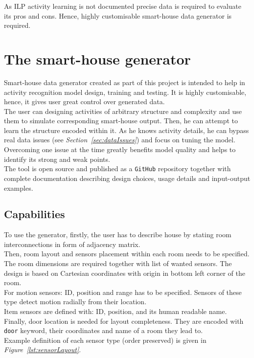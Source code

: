 \documentclass[11pt, a4paper, pdflatex, leqno, twoside, openright]{report}
\begin{document}
As ILP activity learning is not documented precise data is required to evaluate its pros and cons. Hence, highly customisable smart-house data generator is required.

  \section{The smart-house generator}
Smart-house data generator created as part of this project is intended to help in activity recognition model design, training and testing. It is highly customisable, hence, it gives user great control over generated data.\\

The user can designing activities of arbitrary structure and complexity and use them to simulate corresponding smart-house output. Then, he can attempt to learn the structure encoded within it. As he knows activity details, he can bypass real data issues (see \emph{Section~\ref{sec:dataIssues}}) and focus on tuning the model. Overcoming one issue at the time greatly benefits model quality and helps to identify its strong and weak points.\\

The tool is open source and published as a \texttt{GitHub} repository together with complete documentation describing design choices, usage details and input-output examples.

    \subsection{Capabilities}
To use the generator, firstly, the user has to describe house by stating room interconnections in form of adjacency matrix.\\

Then, room layout and sensors placement within each room needs to be specified. The room dimensions are required together with list of wanted sensors. The design is based on Cartesian coordinates with origin in bottom left corner of the room.\\
For motion sensors: ID, position and range has to be specified. Sensors of these type detect motion radially from their location.\\
Item sensors are defined with: ID, position, and its human readable name.\\
Finally, door location is needed for layout completeness. They are encoded with \texttt{door} keyword, their coordinates and name of a room they lead to.\\
Example definition of each sensor type (order preserved) is given in \emph{Figure~\ref{lst:sensorLayout}}.\\
\end{document}
